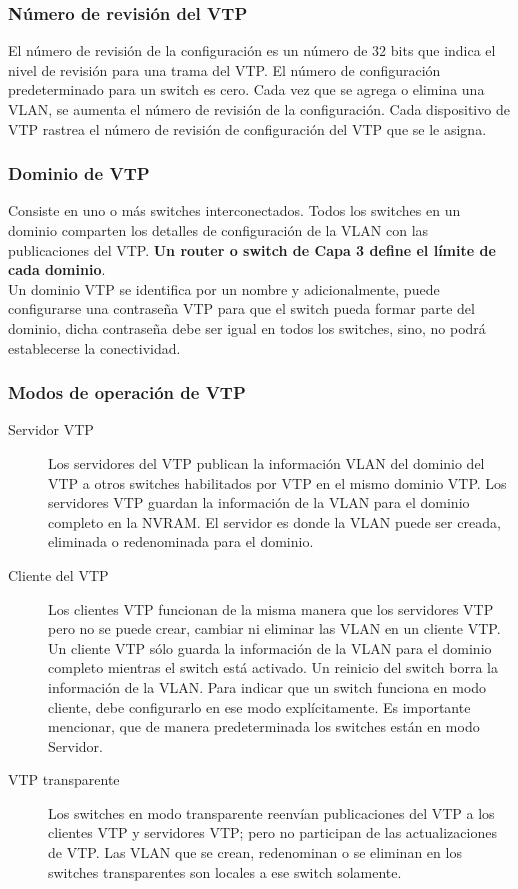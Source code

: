 \documentclass[12pt]{article}
\begin{document}
\subsubsection{Número de revisión del VTP}
El número de revisión de la configuración es un número de 32 bits 
que indica el nivel de revisión para una trama del VTP. El número 
de configuración predeterminado para un switch es cero. Cada 
vez que se agrega o elimina una VLAN, se aumenta el número de 
revisión de la configuración. Cada dispositivo de VTP rastrea el 
número de revisión de configuración del VTP que se le asigna.



 \subsubsection{Dominio de VTP}
Consiste en uno o más switches interconectados. Todos los switches en un dominio comparten los detalles de configuración de la VLAN con las publicaciones del VTP. \textbf{Un router o switch de Capa 3 define el límite de cada dominio}.\\

Un dominio VTP se identifica por un nombre y adicionalmente, puede configurarse una contraseña VTP para que el switch pueda formar parte del dominio, dicha contraseña debe ser igual en todos los switches, sino, no podrá establecerse la conectividad.

\subsubsection{Modos de operación de VTP}
 \begin{description}
 \item[Servidor VTP] Los servidores del VTP publican la información VLAN del dominio del VTP a otros switches habilitados por VTP en el mismo dominio VTP. Los servidores VTP guardan la información de la VLAN para el dominio completo en la NVRAM. El servidor es donde la VLAN puede ser creada, eliminada o redenominada para el dominio.
 \item[Cliente del VTP] Los clientes VTP funcionan de la misma manera que los servidores VTP pero no se puede crear, cambiar ni eliminar las VLAN en un cliente VTP. Un cliente VTP sólo guarda la información de la VLAN para el dominio completo mientras el switch está activado. Un reinicio del switch borra la información de la VLAN. Para indicar que un switch funciona en modo cliente, debe configurarlo en ese modo explícitamente. Es importante mencionar, que de manera predeterminada los switches están en modo Servidor.
 \item[VTP transparente] Los switches en modo transparente reenvían publicaciones del VTP a los clientes VTP y servidores VTP; pero no participan de las actualizaciones de VTP. Las VLAN que se crean, redenominan o se eliminan en los switches transparentes son locales a ese switch solamente.
 \end{description}
\end{document}
